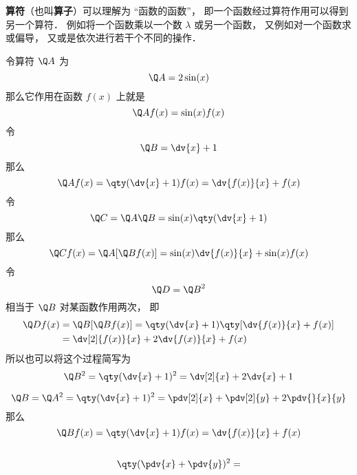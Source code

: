 

\textbf{算符}（也叫\textbf{算子}）可以理解为 “函数的函数”， 即一个函数经过算符作用可以得到另一个算符． 例如将一个函数乘以一个数 $\lambda$ 或另一个函数， 又例如对一个函数求或偏导， 又或是依次进行若干个不同的操作．

\begin{example}{}
令算符 $\Q A$ 为
\begin{equation}
\Q A = 2\sin(x)
\end{equation}
那么它作用在函数 $f(x)$ 上就是
\begin{equation}
\Q A f(x) = \sin(x) f(x)
\end{equation}
令
\begin{equation}
\Q B = \dv{x} + 1
\end{equation}
那么
\begin{equation}
\Q A f(x) = \qty(\dv{x} + 1)f(x) = \dv{f(x)}{x} + f(x)
\end{equation}
令
\begin{equation}
\Q C = \Q A \Q B = \sin(x) \qty(\dv{x} + 1)
\end{equation}
那么
\begin{equation}
\Q C f(x) = \Q A [\Q B f(x)] = \sin(x)\dv{f(x)}{x} + \sin(x)f(x)
\end{equation}
令
\begin{equation}
\Q D = {\Q B}^2
\end{equation}
相当于 $\Q B$ 对某函数作用两次， 即
\begin{equation}
\begin{aligned}
\Q D f(x) &= \Q B [\Q B f(x)] = \qty(\dv{x} + 1)\qty[\dv{f(x)}{x} + f(x)] \\
&= \dv[2]{f(x)}{x} + 2\dv{f(x)}{x} + f(x)
\end{aligned}
\end{equation}
所以也可以将这个过程简写为
\begin{equation}
\Q B^2 = \qty(\dv{x} + 1)^2 = \dv[2]{x} + 2\dv{x} + 1
\end{equation}
\end{example}


\begin{equation}
\Q B = \Q A^2 = \qty(\dv{x} + 1)^2 = \pdv[2]{x} + \pdv[2]{y} + 2\pdv{}{x}{y}
\end{equation}
那么
\begin{equation}
\Q B f(x) = \qty(\dv{x} + 1)f(x) = \dv{f(x)}{x} + f(x)
\end{equation}



\begin{equation}

\end{equation}

\begin{equation}
\qty(\pdv{x} + \pdv{y})^2 = 
\end{equation}

